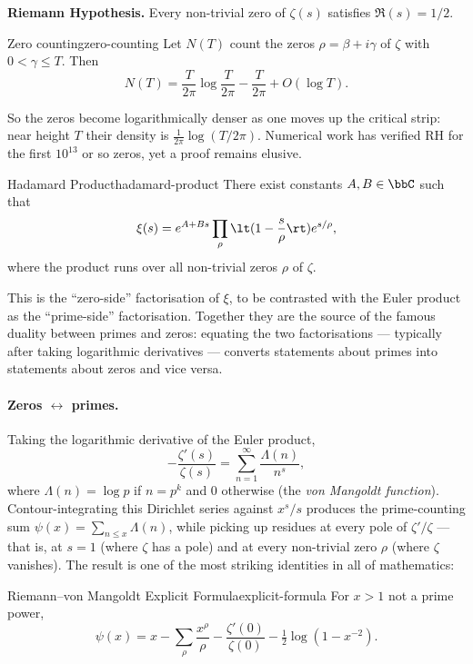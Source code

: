 \begin{Theoremcon}
  \textbf{Riemann Hypothesis.} Every non-trivial zero of $\zeta(s)$ satisfies $\Re(s)=1/2$.
\end{Theoremcon}

\begin{Theorem}{Zero counting}{zero-counting}
  Let $N(T)$ count the zeros $\rho=\beta+i\gamma$ of $\zeta$ with $0<\gamma\leq T$. Then
  $$N(T)=\frac{T}{2\pi}\log\frac{T}{2\pi}-\frac{T}{2\pi}+O(\log T).$$
\end{Theorem}

So the zeros become logarithmically denser as one moves up the critical strip: near height $T$ their density is $\frac{1}{2\pi}\log(T/2\pi)$. Numerical work has verified RH for the first $10^{13}$ or so zeros, yet a proof remains elusive.

\begin{Theorem}{Hadamard Product}{hadamard-product}
  There exist constants $A,B\in\bbC$ such that
  $$\xi(s)=e^{A+Bs}\prod_{\rho}\lt(1-\frac{s}{\rho}\rt)e^{s/\rho},$$
  where the product runs over all non-trivial zeros $\rho$ of $\zeta$.
\end{Theorem}

This is the ``zero-side'' factorisation of $\xi$, to be contrasted with the Euler product as the ``prime-side'' factorisation. Together they are the source of the famous duality between primes and zeros: equating the two factorisations --- typically after taking logarithmic derivatives --- converts statements about primes into statements about zeros and vice versa.

\paragraph{Zeros \texorpdfstring{$\leftrightarrow$}{<->} primes.} Taking the logarithmic derivative of the Euler product,
$$-\frac{\zeta'(s)}{\zeta(s)}=\sum_{n=1}^{\infty}\frac{\Lambda(n)}{n^s},$$
where $\Lambda(n)=\log p$ if $n=p^k$ and $0$ otherwise (the \emph{von Mangoldt function}). Contour-integrating this Dirichlet series against $x^s/s$ produces the prime-counting sum $\psi(x)=\sum_{n\leq x}\Lambda(n)$, while picking up residues at every pole of $\zeta'/\zeta$ --- that is, at $s=1$ (where $\zeta$ has a pole) and at every non-trivial zero $\rho$ (where $\zeta$ vanishes). The result is one of the most striking identities in all of mathematics:

\begin{Theorem}{Riemann--von Mangoldt Explicit Formula}{explicit-formula}
  For $x>1$ not a prime power,
  $$\psi(x)=x-\sum_{\rho}\frac{x^{\rho}}{\rho}-\frac{\zeta'(0)}{\zeta(0)}-\tfrac{1}{2}\log(1-x^{-2}).$$
\end{Theorem}


